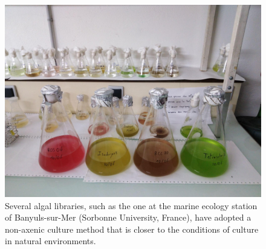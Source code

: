 \begin{figure}[!htbp]
    \centering
    \includegraphics[width=\textwidth]{images/chap2/chap2_alg_02.jpg}
    \caption{Several algal libraries, such as the one at the marine ecology station of Banyuls-sur-Mer (Sorbonne University, France), have adopted a non-axenic culture method that is closer to the conditions of culture in natural environments.}
    \label{fig:ch2alg02}
\end{figure}
\noindent
